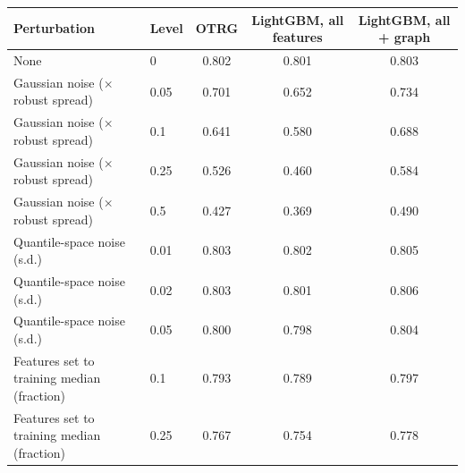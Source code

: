 \begin{tabular}{llccc}
\toprule
Perturbation & Level & OTRG & LightGBM, all features & LightGBM, all + graph \\
\midrule
None & 0 & 0.802 & 0.801 & 0.803 \\
Gaussian noise ($\times$ robust spread) & 0.05 & 0.701 & 0.652 & 0.734 \\
Gaussian noise ($\times$ robust spread) & 0.1 & 0.641 & 0.580 & 0.688 \\
Gaussian noise ($\times$ robust spread) & 0.25 & 0.526 & 0.460 & 0.584 \\
Gaussian noise ($\times$ robust spread) & 0.5 & 0.427 & 0.369 & 0.490 \\
Quantile-space noise (s.d.) & 0.01 & 0.803 & 0.802 & 0.805 \\
Quantile-space noise (s.d.) & 0.02 & 0.803 & 0.801 & 0.806 \\
Quantile-space noise (s.d.) & 0.05 & 0.800 & 0.798 & 0.804 \\
Features set to training median (fraction) & 0.1 & 0.793 & 0.789 & 0.797 \\
Features set to training median (fraction) & 0.25 & 0.767 & 0.754 & 0.778 \\
\bottomrule
\end{tabular}
